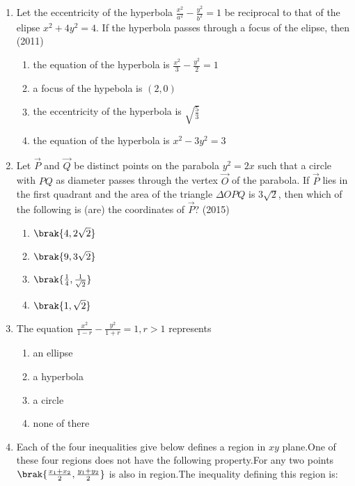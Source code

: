 \begin{enumerate}
	\item Let the eccentricity of the hyperbola $\frac{x^2}{a^2}-\frac{y^2}{b^2}=1$ be reciprocal to that of the elipse $x^2+4y^2=4$. If the hyperbola
	passes through a focus of the elipse, then 
		\hfill(2011)
		 \begin{enumerate}
			\item the equation of the hyperbola is $\frac{x^2}{3}-\frac{y^2}{2}=1$
			\item a focus of the hypebola is $(2,0)$
			\item the eccentricity of the hyperbola is $\sqrt{\frac{5}{3}}$
			\item the equation of the hyperbola is $x^2-3y^2=3$
		 \end{enumerate}
	\item Let $\vec{P}$ and $\vec{Q}$ be distinct points on the parabola $y^2=2x$ such 
		that a circle with $PQ$ as diameter passes through the vertex
		$\vec{O}$ of the parabola. If $\vec{P}$ lies in the first quadrant and the area
		of the triangle  \(\Delta \)$OPQ$ is 3$\sqrt{2}$, then which of the following is
		(are) the coordinates of $\vec{P}$?  
		\hfill(2015)
				\begin{multicols}{4}
		 \begin{enumerate}
			\item $ \brak{4,2\sqrt{2}}$
			\item $\brak{9,3\sqrt{2}}$
			\item $ \brak{\frac{1}{4},\frac{1}{\sqrt{2}}}$
			\item  $ \brak{1,\sqrt{2}}$
		 \end{enumerate}\end{multicols}
    \item The equation $\frac{x^2}{1-r}-\frac{y^2}{1+r}=1,r > 1$
represents
          \hfill  {}
					\begin{multicols}{2}
\begin{enumerate}
    \item an ellipse    \item       a hyperbola
   \item a circle     \item    none of there 
\end{enumerate}\end{multicols}
\item Each of the four inequalities give below defines a region in $xy$ plane.One of these four regions does not have the following property.For any two points   $\brak{\frac{x_1+x_2}{2},\frac{y_1+y_2}{2}}$   is also in region.The inequality defining this region is:

\end{enumerate}
